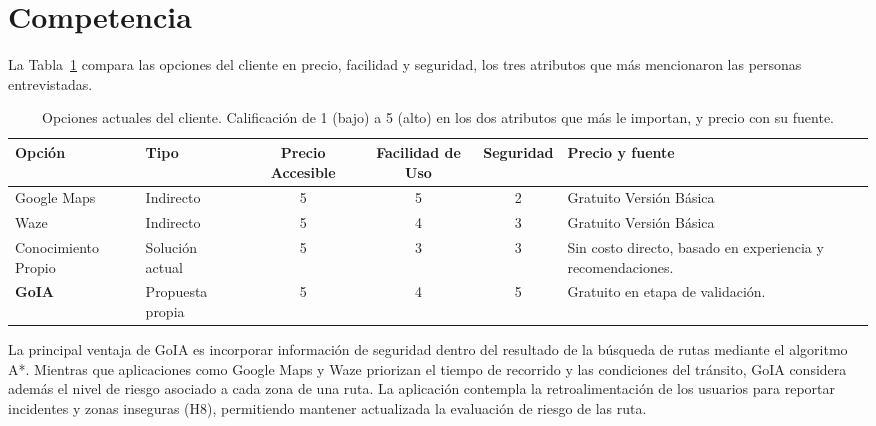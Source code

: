 \documentclass[11pt]{article}
\begin{document}
\section{Competencia}
\label{sec:competencia}

La Tabla~\ref{tab:competencia} compara las opciones del cliente en precio, facilidad y seguridad, los tres atributos que más mencionaron las personas entrevistadas.

\begin{table}[H]
  \caption{Opciones actuales del cliente. Calificación de 1 (bajo) a 5 (alto) en los dos
    atributos que más le importan, y precio con su fuente.}
  \label{tab:competencia}
  \small
  \renewcommand{\arraystretch}{1.2}
  \begin{tabularx}{\textwidth}{@{}Xp{}cccp{}@{}}
    \toprule
    Opción & Tipo & Precio Accesible & Facilidad de Uso & Seguridad & Precio y fuente \\
    \midrule
    Google Maps & Indirecto & 5 &  5& 2 & Gratuito Versión Básica\\
    Waze  & Indirecto & 5 &  4& 3 & Gratuito Versión Básica \\
    Conocimiento Propio & Solución actual & 5 &  3& 3 & Sin costo directo, basado en experiencia y recomendaciones.\\
    \textbf{GoIA}  & Propuesta propia & 5 & 4 & 5 & Gratuito en etapa de validación.\\
    \bottomrule
  \end{tabularx}
\end{table}

La principal ventaja de GoIA es incorporar información de seguridad dentro del resultado de la búsqueda de rutas mediante el algoritmo A*. Mientras que aplicaciones como Google Maps y Waze priorizan el tiempo de recorrido y las condiciones del tránsito, GoIA considera además el nivel de riesgo asociado a cada zona de una ruta. La aplicación contempla la retroalimentación de los usuarios para reportar incidentes y zonas inseguras (H8), permitiendo mantener actualizada la evaluación de riesgo de las ruta.
\end{document}
